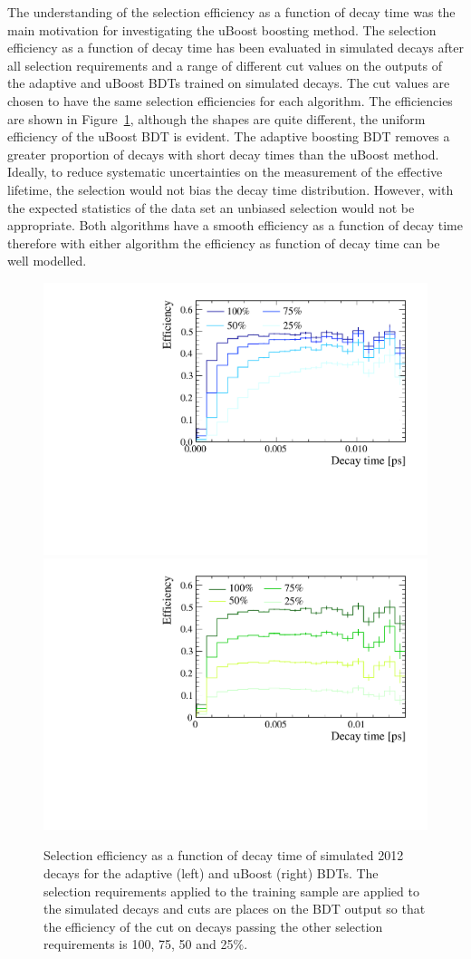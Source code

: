 The understanding of the selection efficiency as a function of decay time was the main motivation for investigating the uBoost boosting method. %
The selection efficiency as a function of decay time has been evaluated in simulated \bsmumu decays after all selection requirements and a range of different cut values on the outputs of the adaptive and uBoost BDTs trained on simulated decays. The cut values are chosen to have the same selection efficiencies for each algorithm. The efficiencies are shown in Figure~\ref{fig:accptsELBDTs}, although the shapes are quite different, the uniform efficiency of the uBoost BDT is evident. The adaptive boosting BDT removes a greater proportion of decays with short decay times than the uBoost method. Ideally, to reduce systematic uncertainties on the measurement of the effective lifetime, the selection would not bias the decay time distribution. However, with the expected statistics of the data set an unbiased selection would not be appropriate. Both algorithms have a smooth efficiency as a function of decay time therefore with either algorithm the efficiency as function of decay time can be well modelled. 
\begin{figure}[htbp]
    \centering
        \includegraphics[width=0.49 \textwidth]{./Figs/Selection/BDT_acceptances.pdf}
       \includegraphics[width=0.49 \textwidth]{./Figs/Selection/uBoost_accpt.pdf}
    \caption{Selection efficiency as a function of decay time of simulated 2012 \bsmumu decays for the adaptive (left) and uBoost (right) BDTs. The selection requirements applied to the training sample are applied to the simulated decays and cuts are places on the BDT output so that the efficiency of the cut on decays passing the other selection requirements is 100, 75, 50 and 25$\%$. }
    \label{fig:accptsELBDTs}
\end{figure}

